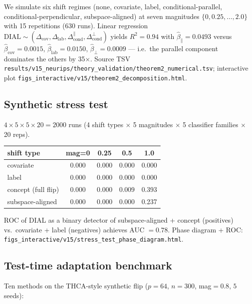 \documentclass{article}
\newcommand{\dial}{\mathrm{DIAL}}
\begin{document}
We simulate six shift regimes (none, covariate, label, conditional-parallel,
conditional-perpendicular, subspace-aligned) at seven magnitudes
$\{0,0.25,\ldots,2.0\}$ with 15 repetitions ($630$ runs).
Linear regression $\dial \sim
(\Delta_{\text{cov}},\Delta_{\text{lab}},\Delta_{\text{cond}}^{\parallel},
\Delta_{\text{cond}}^{\perp})$ yields
$R^{2}=0.94$ with $\hat\beta_{\parallel}=0.0493$ versus
$\hat\beta_{\text{cov}}=0.0015$,
$\hat\beta_{\text{lab}}=0.0150$,
$\hat\beta_{\perp}=0.0009$ — i.e.\ the parallel component dominates the
others by 35\(\times\). Source TSV
\texttt{results/v15\_neurips/theory\_validation/theorem2\_numerical.tsv};
interactive plot \texttt{figs\_interactive/v15/theorem2\_decomposition.html}.

\subsection{Synthetic stress test}

$4\times 5\times 5\times 20 = 2000$ runs (4 shift types $\times$ 5
magnitudes $\times$ 5 classifier families $\times$ 20 reps).

\begin{center}
\begin{tabular}{lcccc}
\toprule
shift type & mag=0 & 0.25 & 0.5 & 1.0 \\
\midrule
covariate           & 0.000 & 0.000 & 0.000 & 0.000 \\
label               & 0.000 & 0.000 & 0.000 & 0.000 \\
concept (full flip) & 0.000 & 0.000 & 0.009 & 0.393 \\
subspace-aligned    & 0.000 & 0.000 & 0.000 & 0.237 \\
\bottomrule
\end{tabular}
\end{center}

ROC of DIAL as a binary detector of subspace-aligned + concept (positives)
vs.\ covariate + label (negatives) achieves AUC $=0.78$. Phase diagram +
ROC: \texttt{figs\_interactive/v15/stress\_test\_phase\_diagram.html}.

\subsection{Test-time adaptation benchmark}

Ten methods on the THCA-style synthetic flip
($p=64$, $n=300$, mag$=0.8$, $5$ seeds):
\end{document}
